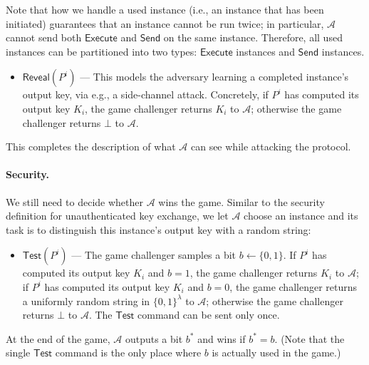 \documentclass{article}
\newcommand{\adv}{\mathcal{A}}
\newcommand{\Execute}{\mathsf{Execute}}
\newcommand{\Send}{\mathsf{Send}}
\newcommand{\Reveal}{\mathsf{Reveal}}
\newcommand{\Test}{\mathsf{Test}}
\begin{document}
Note that how we handle a used instance (i.e., an instance that has been initiated) guarantees that an instance cannot be run twice; in particular, $\adv$ cannot send both $\Execute$ and $\Send$ on the same instance. Therefore, all used instances can be partitioned into two types: $\Execute$ instances and $\Send$ instances.
\begin{itemize}
  \item $\Reveal(P^i)$ --- This models the adversary learning a completed instance's output key, via e.g., a side-channel attack. Concretely, if $P^i$ has computed its output key $K_i$, the game challenger returns $K_i$ to $\adv$; otherwise the game challenger returns $\bot$ to $\adv$.
\end{itemize}

This completes the description of what $\adv$ can see while attacking the protocol.
\paragraph{Security.}
We still need to decide whether $\adv$ wins the game. Similar to the security definition for unauthenticated key exchange, we let $\adv$ choose an instance and its task is to distinguish this instance's output key with a random string:
\begin{itemize}
  \item $\Test(P^i)$ --- The game challenger samples a bit $b \gets \{0,1\}$. If $P^i$ has computed its output key $K_i$ and $b = 1$, the game challenger returns $K_i$ to $\adv$; if $P^i$ has computed its output key $K_i$ and $b = 0$, the game challenger returns a uniformly random string in $\{0,1\}^\lambda$ to $\adv$; otherwise the game challenger returns $\bot$ to $\adv$. The $\Test$ command can be sent only once.
\end{itemize}
At the end of the game, $\adv$ outputs a bit $b^*$ and wins if $b^* = b$. (Note that the single $\Test$ command is the only place where $b$ is actually used in the game.)
\end{document}
